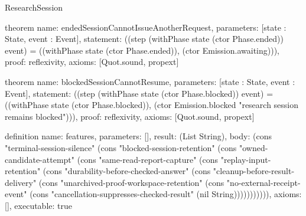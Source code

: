 \begin{lexlean}{ResearchSession}
\begin{semanticmodule}
theorem{
 name: endedSessionCannotIssueAnotherRequest,
 parameters: [state : State, event : Event],
 statement: ((step (withPhase state (ctor Phase.ended)) event) = ((withPhase state (ctor Phase.ended)), (ctor Emission.awaiting))),
 proof: reflexivity{},
 axioms: [Quot.sound, propext]
}

theorem{
 name: blockedSessionCannotResume,
 parameters: [state : State, event : Event],
 statement: ((step (withPhase state (ctor Phase.blocked)) event) = ((withPhase state (ctor Phase.blocked)), (ctor Emission.blocked "research session remains blocked"))),
 proof: reflexivity{},
 axioms: [Quot.sound, propext]
}

definition{
 name: features,
 parameters: [],
 result: (List String),
 body: (cons "terminal-session-silence" (cons "blocked-session-retention" (cons "owned-candidate-attempt" (cons "same-read-report-capture" (cons "replay-input-retention" (cons "durability-before-checked-answer" (cons "cleanup-before-result-delivery" (cons "unarchived-proof-workspace-retention" (cons "no-external-receipt-event" (cons "cancellation-suppresses-checked-result" (nil String))))))))))),
 axioms: [],
 executable: true
}

\end{semanticmodule}
\end{lexlean}
